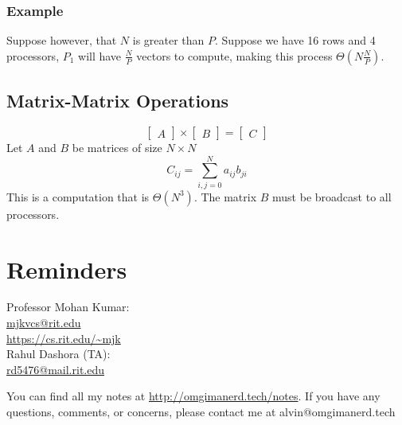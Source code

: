 \documentclass{math}
\begin{document}
\subsubsection*{Example}
Suppose however, that \( N \) is greater than \( P \). Suppose we have 16 rows
and 4 processors, \( P_1 \) will have \( \frac{N}{P} \) vectors to compute,
making this process \( \Theta(N\frac{N}{P}) \).

\subsection*{Matrix-Matrix Operations}
\[ \begin{bmatrix}A\end{bmatrix}\times
  \begin{bmatrix}B\end{bmatrix} = \begin{bmatrix}C\end{bmatrix} \]
Let \( A \) and \( B \) be matrices of size \( N\times N \)
\[ C_{ij} = \sum_{i,j=0}^{N}a_{ij}b_{ji} \]
This is a computation that is \( \Theta(N^3) \). The matrix \( B \) must be
broadcast to all processors.

\section*{Reminders}
Professor Mohan Kumar: \\
\url{mjkvcs@rit.edu} \\
\url{https://cs.rit.edu/~mjk} \\

\noindent Rahul Dashora (TA): \\
\url{rd5476@mail.rit.edu}

\begin{center}
  You can find all my notes at \url{http://omgimanerd.tech/notes}. If you have
  any questions, comments, or concerns, please contact me at
  alvin@omgimanerd.tech
\end{center}
\end{document}
